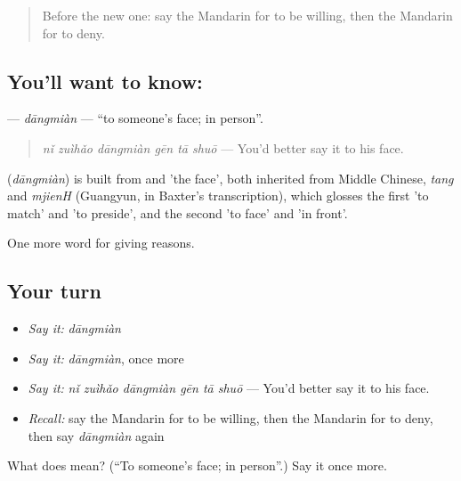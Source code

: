 \label{lesson:ZH-C355-dangmian}



\begin{quote}
Before the new one: say the Mandarin for to be willing, then the Mandarin for to deny.
\end{quote}

\subsection*{You'll want to know: }
\textbf{} — \emph{dāngmiàn} — \textquotedblleft{}to someone's face; in person\textquotedblright{}.

\begin{quote}
\emph{nǐ zuìhǎo dāngmiàn gēn tā shuō} — You'd better say it to his face.
\end{quote}

\begin{cousinweb}
\textbf{} (\emph{dāngmiàn}) is built from  and  'the face', both inherited from Middle Chinese, \emph{tang} and \emph{mjienH} (Guangyun, in Baxter's transcription), which glosses the first 'to match' and 'to preside', and the second 'to face' and 'in front'.
\end{cousinweb}

\begin{grammarlens}[title={What you've built}]
One more word for giving reasons.
\end{grammarlens}

\subsection*{Your turn}
\begin{itemize}
\raggedright
  \item \emph{Say it:} \emph{dāngmiàn}
  \item \emph{Say it:} \emph{dāngmiàn}, once more
  \item \emph{Say it:} \emph{nǐ zuìhǎo dāngmiàn gēn tā shuō} — You'd better say it to his face.
  \item \emph{Recall:} say the Mandarin for to be willing, then the Mandarin for to deny, then say \emph{dāngmiàn} again
\end{itemize}

\begin{tcolorbox}[breakable,colback=teal!4,colframe=teal!35!black,title={Before you move on}]
What does  mean? (\textquotedblleft{}To someone's face; in person\textquotedblright{}.) Say it once more.
\end{tcolorbox}
